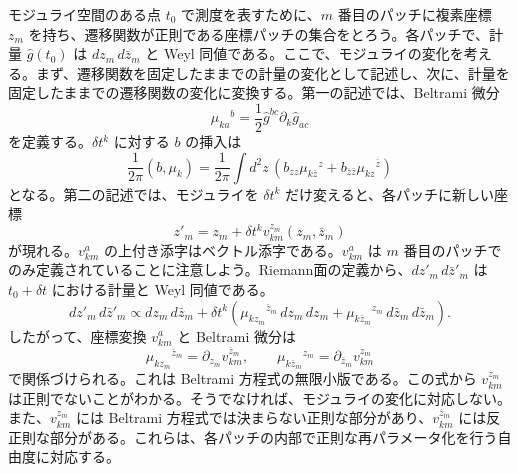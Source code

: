 モジュライ空間のある点 $t_0$ で測度を表すために、$m$ 番目のパッチに複素座標 $z_m$ を持ち、遷移関数が正則である座標パッチの集合をとろう。各パッチで、計量 $\hat g(t_0)$ は $dz_m\,d\bar z_m$ と Weyl 同値である。ここで、モジュライの変化を考える。まず、遷移関数を固定したままでの計量の変化として記述し、次に、計量を固定したままでの遷移関数の変化に変換する。第一の記述では、Beltrami 微分
\begin{equation}
\mu_{ka}{}^b=\frac12\hat g^{bc}\partial_k\hat g_{ac}
\tag{5.4.7}\label{eq:5.4.7}
\end{equation}
を定義する。$\delta t^k$ に対する $b$ の挿入は
\begin{equation}
\frac{1}{2\pi}(b,\mu_k)
=\frac{1}{2\pi}\int d^2z\,
\left(b_{zz}\mu_{k\bar z}{}^z
+b_{\bar z\bar z}\mu_{kz}{}^{\bar z}\right)
\tag{5.4.8}\label{eq:5.4.8}
\end{equation}
となる。第二の記述では、モジュライを $\delta t^k$ だけ変えると、各パッチに新しい座標
\begin{equation}
z'_m=z_m+\delta t^k v_{km}^{z_m}(z_m,\bar z_m)
\tag{5.4.9}\label{eq:5.4.9}
\end{equation}
が現れる。$v_{km}^a$ の上付き添字はベクトル添字である。$v_{km}^a$ は $m$ 番目のパッチでのみ定義されていることに注意しよう。Riemann面の定義から、$dz'_m\,d\bar z'_m$ は $t_0+\delta t$ における計量と Weyl 同値である。
\begin{equation}
dz'_m\,d\bar z'_m
\propto dz_m\,d\bar z_m
+\delta t^k\left(
\mu_{kz_m}{}^{\bar z_m}\,dz_m\,dz_m
+\mu_{k\bar z_m}{}^{z_m}\,d\bar z_m\,d\bar z_m
\right).
\tag{5.4.10}\label{eq:5.4.10}
\end{equation}
したがって、座標変換 $v_{km}^a$ と Beltrami 微分は
\begin{equation}
\mu_{kz_m}{}^{\bar z_m}=\partial_{z_m}v_{km}^{\bar z_m},
\qquad
\mu_{k\bar z_m}{}^{z_m}=\partial_{\bar z_m}v_{km}^{z_m}
\tag{5.4.11}\label{eq:5.4.11}
\end{equation}
で関係づけられる。これは Beltrami 方程式の無限小版である。この式から $v_{km}^{z_m}$ は正則でないことがわかる。そうでなければ、モジュライの変化に対応しない。また、$v_{km}^{z_m}$ には Beltrami 方程式では決まらない正則な部分があり、$v_{km}^{\bar z_m}$ には反正則な部分がある。これらは、各パッチの内部で正則な再パラメータ化を行う自由度に対応する。

